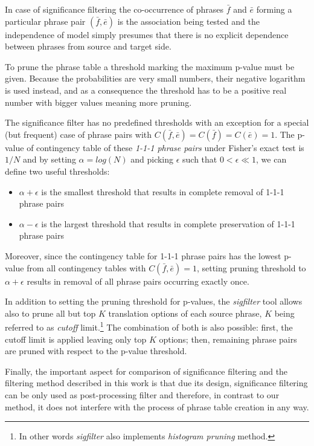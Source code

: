 In case of significance filtering the co-occurrence of phrases $\bar{f}$ and $\bar{e}$
forming a particular phrase pair $(\bar{f},\bar{e})$ is the association being tested
and the independence of model simply presumes that there is no explicit dependence
between phrases from source and target side.

To prune the phrase table a threshold marking the maximum p-value must be given.
Because the probabilities are very small numbers, their negative logarithm is used
instead, and as a consequence the threshold has to be a positive real number with
bigger values meaning more pruning.

The significance filter has no predefined thresholds with an exception for a special
(but frequent) case of phrase pairs with $C(\bar{f},\bar{e}) = C(\bar{f}) = C(\bar{e}) = 1$.
The p-value of contingency table of these \emph{1-1-1 phrase pairs} under Fisher's
exact test is $1/N$ and by setting $\alpha = log(N)$ and picking $\epsilon$ such that
$0 < \epsilon \ll 1$, we can define two useful thresholds:
\begin{itemize}
  \item $\alpha + \epsilon$ is the smallest threshold that results in complete removal
    of 1-1-1 phrase pairs
  \item $\alpha - \epsilon$ is the largest threshold that results in complete preservation
    of 1-1-1 phrase pairs
\end{itemize}

Moreover, since the contingency table for 1-1-1 phrase pairs has the lowest p-value
from all contingency tables with $C(\bar{f},\bar{e}) = 1$, setting pruning threshold
to $\alpha + \epsilon$ results in removal of all phrase pairs occurring exactly once.

In addition to setting the pruning threshold for p-values, the \emph{sigfilter} tool
allows also to prune all but top $K$ translation options of each source phrase,
$K$ being referred to as \emph{cutoff} limit.\footnote{In other words \emph{sigfilter}
also implements \emph{histogram pruning} method.}
The combination of both is also possible: first, the cutoff limit is applied leaving
only top $K$ options; then, remaining phrase pairs are pruned with respect to the
p-value threshold.

Finally, the important aspect for comparison of significance filtering and the
filtering method described in this work is that due its design, significance
filtering can be only used as post-processing filter and therefore, in contrast to
our method, it does not interfere with the process of phrase table creation in any way.

